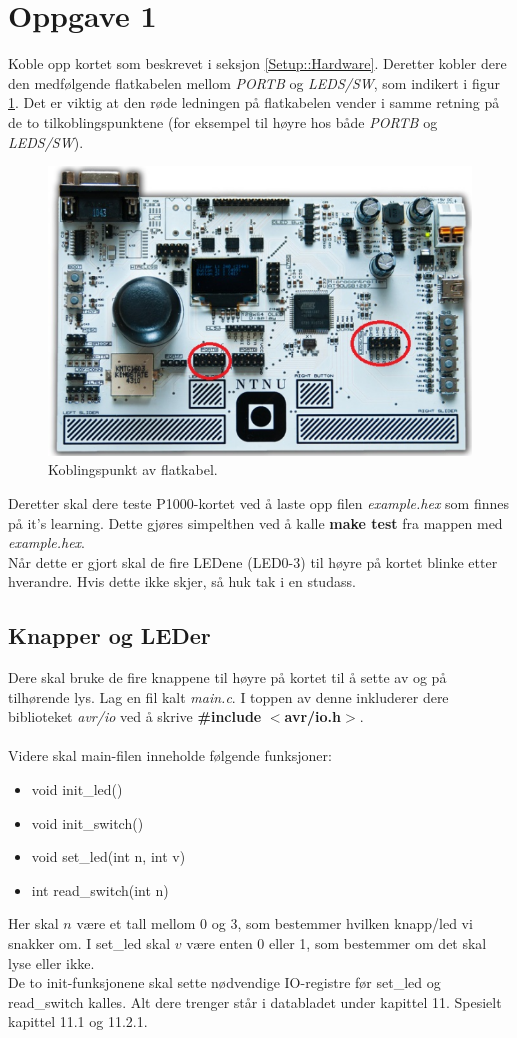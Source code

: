 \documentclass[11pt,a4paper]{article}
\begin{document}
\section{Oppgave 1}
Koble opp kortet som beskrevet i seksjon \ref{Setup::Hardware}. Deretter kobler dere den medfølgende flatkabelen mellom \textit{PORTB} og \textit{LEDS/SW}, som indikert i figur \ref{PORTB::LEDS}. Det er viktig at den røde ledningen på flatkabelen vender i samme retning på de to tilkoblingspunktene (for eksempel til høyre hos både \textit{PORTB} og \textit{LEDS/SW}).
\begin{figure}[htb]
\centering
\includegraphics[width=0.8\linewidth]{portb_leds.png}
\caption{Koblingspunkt av flatkabel.}
\label{PORTB::LEDS}
\end{figure}
Deretter skal dere teste P1000-kortet ved å laste opp filen \textit{example.hex} som finnes på it's learning. Dette gjøres simpelthen ved å kalle \textbf{make test} fra mappen med \textit{example.hex}.\\
Når dette er gjort skal de fire LEDene (LED0-3) til høyre på kortet blinke etter hverandre. Hvis dette ikke skjer, så huk tak i en studass.
\subsection{Knapper og LEDer}
Dere skal bruke de fire knappene til høyre på kortet til å sette av og på tilhørende lys. Lag en fil kalt \textit{main.c}. I toppen av denne inkluderer dere biblioteket \textit{avr/io} ved å skrive \textbf{\#include} $<$\textbf{avr/io.h}$>$.\\
\\
Videre skal main-filen inneholde følgende funksjoner:
\begin{itemize}
\item void init\_led()
\item void init\_switch()
\item void set\_led(int n, int v)
\item int read\_switch(int n)
\end{itemize}
Her skal $n$ være et tall mellom 0 og 3, som bestemmer hvilken knapp/led vi snakker om. I set\_led skal $v$ være enten 0 eller 1, som bestemmer om det skal lyse eller ikke.\\
De to init-funksjonene skal sette nødvendige IO-registre før set\_led og read\_switch kalles. Alt dere trenger står i databladet under kapittel 11. Spesielt kapittel 11.1 og 11.2.1.
\end{document}
